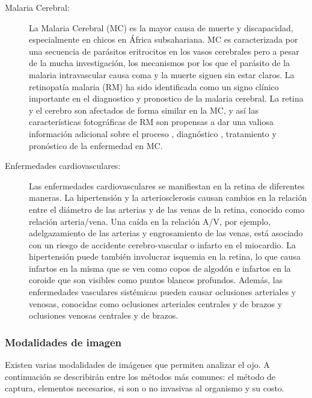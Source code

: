 \begin{description}
     
\item[Malaria Cerebral:]La Malaria Cerebral (MC) es la mayor causa de muerte y discapacidad, especialmente en chicos en África subsahariana. MC es caracterizada por una secuencia de parásitos eritrocitos
en los vasos cerebrales pero a pesar de la mucha  investigación, los mecanismos por los que el parásito de la malaria intravascular causa coma y la muerte siguen sin estar claros.
La retinopatía  malaria (RM) ha sido identificada como un signo clínico importante en el diagnostico y pronostico de la malaria cerebral. La retina y el cerebro son afectados de forma similar en la MC, y así las características fotográficas de RM son propensas a dar una valiosa información adicional sobre el proceso , diagnóstico , tratamiento y pronóstico de la enfermedad en MC.

     
     \item[Enfermedades cardiovasculares:] Las enfermedades cardiovasculares se manifiestan en la retina de diferentes maneras. La hipertensión y la arteriosclerosis causan cambios en la relación entre el diámetro de las arterias y de las venas de la retina, conocido como relación arteria/vena. Una caída en la relación A/V, por ejemplo, adelgazamiento de las arterias y engrosamiento de las venas, está asociado con un riesgo de accidente cerebro-vascular o infarto en el miocardio. La hipertensión puede también involucrar isquemia en la retina, lo que causa infartos en la misma que se ven como copos de algodón e infartos en la coroide que son visibles como puntos blancos profundos. Además, las enfermedades vasculares sistémicas pueden causar oclusiones arteriales y venosas, conocidas como oclusiones arteriales centrales y de brazos y oclusiones venosas centrales y de brazos. \cite{fraz2012blood}
\end{description}






			\subsubsection{Modalidades de imagen}



Existen varias modalidades de imágenes que permiten analizar el ojo. A continuación se describirán entre los métodos más comunes: el método de captura, elementos necesarios, si son o no invasivas al organismo y su costo.

